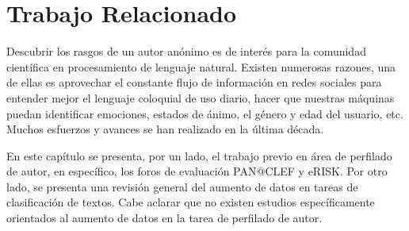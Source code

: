 \chapter{Trabajo Relacionado}


Descubrir los rasgos de un autor anónimo es de interés para la comunidad científica en procesamiento de lenguaje natural. Existen numerosas razones, una de ellas es aprovechar el constante flujo de información en redes sociales para entender mejor el lenguaje coloquial de uso diario, hacer que nuestras máquinas puedan identificar emociones, estados de ánimo, el género y edad del usuario, etc. Muchos esfuerzos y avances se han realizado en la última década. 

En este capítulo se presenta, por un lado, el trabajo previo en área de perfilado de autor, en específico, los foros de evaluación PAN@CLEF y eRISK. Por otro lado, se presenta una revisión general del aumento de datos en tareas de clasificación de textos. Cabe aclarar que no existen estudios específicamente orientados al aumento de datos en la tarea de perfilado de autor. 















